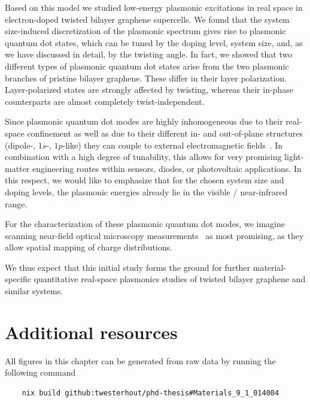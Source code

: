Based on this model we studied low-energy plasmonic excitations in real space in electron-doped twisted bilayer graphene supercells. We found that the system size-induced discretization of the plasmonic spectrum gives rise to plasmonic quantum dot states, which can be tuned by the doping level, system size, and, as we have discussed in detail, by the twisting angle. In fact, we showed that two different types of plasmonic quantum dot states arise from the two plasmonic branches of pristine bilayer graphene. These differ in their layer polarization. Layer-polarized states are strongly affected by twisting, whereas their in-phase counterparts are almost completely twist-independent.

Since plasmonic quantum dot modes are highly inhomogeneous due to their real-space confinement as well as due to their different in- and out-of-plane structures (dipole-, $1s$-, $1p$-like) they can couple to external electromagnetic fields~\cite{crowell_surface-plasmon_1970,maradudin_scattering_1975}. In combination with a high degree of tunability, this allows for very promising light-matter engineering routes within sensors, diodes, or photovoltaic applications. In this respect, we would like to emphasize that for the chosen system size and doping levels, the plasmonic energies already lie in the visible / near-infrared range. 

For the characterization of these plasmonic quantum dot modes, we imagine scanning near-field optical microscopy measurements~\cite{fei_gate-tuning_2012,chen_optical_2012} as most promising, as they allow spatial mapping of charge distributions.

We thus expect that this initial study forms the ground for further material-specific quantitative real-space plasmonics studies of twisted bilayer graphene and similar systems.

\section{Additional resources}


\noindent All figures in this chapter can be generated from raw data by running the following command
\begin{verbatim}
    nix build github:twesterhout/phd-thesis#Materials_9_1_014004
\end{verbatim}
